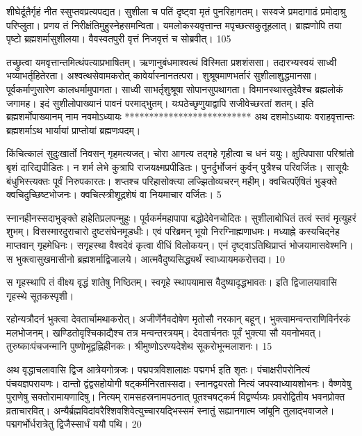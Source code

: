 शीघेर्दूतैर्गृहं नीत स्सुप्तवप्रत्यपद्यत।
 सुशीला च पतिं दृष्ट्वा मृतं पुनरिहागतम्।
 सस्वजे प्रमदागाढं प्रमोदाश्रु परिप्लुता।
 प्रणय तं निरीक्षंतिमुहुस्नेहसमन्विता।
 यमलोकस्यवृत्तान्त मपृच्छत्सकुतूहलात्।
 ब्राह्मणोपि तया पृष्टो ब्रह्मशर्मासुशीलया।
 वैवस्वतपुरी वृत्तं निजवृत्तं च सोब्रवीत्।
 105

  तच्छ्रुत्वा यमवृत्तान्तमित्थंपत्याप्रभाषितम्।
 ऋणानुबंधमाश्वत्थं विस्मिता प्रशशंससा।
 तदारभ्यस्वयं साध्वी भव्याभर्तृहितेरता।
 अश्वत्थसेवामकरोत् कावेर्यास्नानतत्परा।
 शुश्रूषमाणभर्तारं सुशीलाशुद्धमानसा।
 पूर्वकर्माणुसारेण कालधर्मामुपागता।
 साध्वी साभर्तृशुश्रूषा सोपानसुपथागता।
 विमानस्थास्तुदेवैश्च ब्रह्मलोकं जगामह।
 इदं सुशीलोपाख्यानं पावनं परमाद्भुतम्।
 यःपठेच्छृणुयाद्वापि सजीवेच्छरतां शतम्।
 इति ब्रह्मशर्मोपाख्यानम् नाम नवमोऽध्यायः
**************************
अथ दशमोऽध्यायः
वराहवृत्तान्तः ब्रह्मशर्माऽथ भार्यायां प्राप्तोयां ब्रह्मणःपदम्।

किंचित्कालं सुदुःखार्तो निवसन् गृहमत्यजत्।
 चोरा आगत्य तद्गहे गृहीत्वा च धनं ययुः।
 क्षुत्पिपासा परिश्रांतो बृशं दारिद्यपीडितः।
 न शर्म लेभे कुत्रापि राजयक्ष्मप्रपीडितः।
 पुनर्दुर्भोजनं कुर्वन् पुत्रैश्च परिवर्जितः।
 सासूयैः बंधुभिस्त्यक्तः पूर्वं निरुपकारतः।
 शप्तश्च परिहासोक्त्या लज्झितोव्यचरन् महीम्।
 क्वचित्पऍषितं भुङ्क्ते क्वचिदुच्छिष्टभोजनः।
 क्वचित्स्त्रीशूद्रशेषं वा नियमाचार वर्जितः।
 5

  स्नानहीनस्सदाभुङ्क्ते हाहेतिप्रलपन्मुहुः।
 पूर्वकर्ममहापापा बद्धोदेवेनचोदितः।
 सुशीलाबोधितं तत्वं स्तवं मृत्युहरं शुभम्।
 विसस्मारदुराचारो दुष्टसंघेनमूडधीः।
 एवं परिब्रमन् भूयो निरग्निाह्मणाधमः।
 मध्याह्ने कस्यचिद्नेह माप्तवान् गृहमेधिनः।
 सगृहस्था वैश्वदेवं कृत्वा वीधिं विलोकयन्।
 एनं दृष्ट्वाऽतिथिप्राप्तं भोजयामासवेश्मनि।
 स भुक्त्वासुखमासीनो ब्रह्मशर्माद्विजालये।
 आत्मवैदुष्यसिद्ध्यर्थं स्वाध्यायमकरोत्तदा।
 10

  स गृहस्थापि तं वीक्ष्य वृद्धं शांतेषु निष्ठितम्।
 स्वगृहे स्थापयामास वैदुष्यादृद्धभावतः।
 इति द्विजालयावासि गृहस्थे सूतकस्पृशी।
 
रहोन्यत्रौदनं भुक्त्वा देवतार्चामथाकरोत्।
 अजीर्णेनैवदोषेण मृतोसौ नरकान् बहून्।
 भुक्त्वामन्वन्तराणिविर्नरकं मलभोजनम्।
 खण्डितोवृश्चिकाद्यैश्च तत्र मन्वन्तरत्रयम्।
 देवतार्चनतः पूर्वं भुक्त्या सौ यवनोभवत्।
 तुरुष्काःपंचजन्मानि पुष्णोभूद्वह्निहीनकः।
 श्रीमुष्णोऽरण्यदेशेथ सूकरोभून्मलाशनः।
 15

  अथ वृद्धाचलावासि द्विज आत्रेयगोत्रजः।
 पद्मपत्रविशालाक्षः पद्मगर्भ इति शृतः।
 पंचाक्षरीपरोनित्यं पंचयज्ञपरायणः।
 दान्तो द्वंद्वसहोयोगी षट्कर्मनिरतास्सदा।
 स्नानद्वयरतो नित्यं जपस्वाध्यायशोभनः।
 वैष्णवेषु पुराणेषु सक्तोरामायणादिषु।
 नित्यम् रामसहस्रनामपठनात् पूतश्चषट्कर्म विद्वर्ण्यग्र्यः प्रवरोद्वितीय भवनप्रोक्त व्रताचारवित्।
 अन्यैर्ब्रह्मविदांवरैश्शिवशिवेत्युच्चारयद्भिस्समं स्नातुं सह्यानगात्म जांबूनि तुलाद्भवाजले।
 पद्मगर्भोर्धरात्रेतु द्विजैस्सार्धं ययौ पथि।
 20

